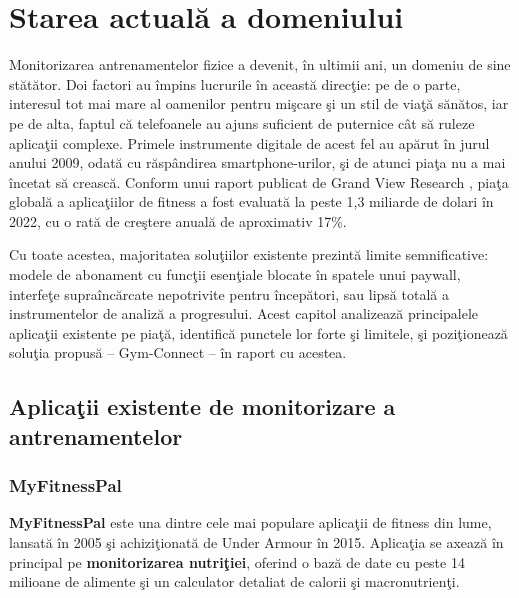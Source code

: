 \chapter{Starea actual\u a a domeniului}

Monitorizarea antrenamentelor fizice a devenit, \^ in ultimii ani, un domeniu
de sine st\u at\u ator. Doi factori au \^ impins lucrurile \^ in aceast\u a
direc\c tie: pe de o parte, interesul tot mai mare al oamenilor pentru
mi\c scare \c si un stil de via\c t\u a s\u an\u atos, iar pe de alta, faptul c\u a
telefoanele au ajuns suficient de puternice c\^ at s\u a ruleze aplica\c tii
complexe. Primele instrumente digitale de acest fel au ap\u arut \^ in jurul
anului 2009, odat\u a cu r\u asp\^ andirea smartphone-urilor, \c si de atunci
pia\c ta nu a mai \^ incetat s\u a creasc\u a. Conform
unui raport publicat de Grand View Research \cite{grandview2023fitness},
pia\c ta global\u a a aplica\c tiilor de fitness a fost evaluat\u a la peste
1,3 miliarde de dolari \^ in 2022, cu o rat\u a de cre\c stere anual\u a de
aproximativ 17\%.

Cu toate acestea, majoritatea solu\c tiilor existente prezint\u a limite
semnificative: modele de abonament cu func\c tii esen\c tiale blocate \^ in spatele
unui paywall, interfe\c te supra\^ inc\u arcate nepotrivite pentru \^ incep\u atori, sau
lips\u a total\u a a instrumentelor de analiz\u a a progresului. Acest capitol
analizeaz\u a principalele aplica\c tii existente pe pia\c t\u a, identific\u a
punctele lor forte \c si limitele, \c si pozi\c tioneaz\u a solu\c tia propus\u a --
Gym-Connect -- \^ in raport cu acestea.

\section{Aplica\c tii existente de monitorizare a antrenamentelor}

\subsection{MyFitnessPal}

\textbf{MyFitnessPal} \cite{myfitnesspal2024} este una dintre cele mai populare
aplica\c tii de fitness din lume, lansat\u a \^ in 2005 \c si achizi\c tionat\u a de
Under Armour \^ in 2015. Aplica\c tia se axeaz\u a \^ in principal pe
\textbf{monitorizarea nutri\c tiei}, oferind o baz\u a de date cu peste 14 milioane
de alimente \c si un calculator detaliat de calorii \c si macronutrien\c ti.

